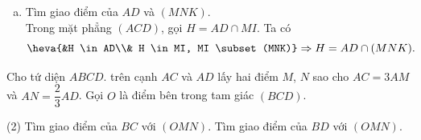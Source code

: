 \begin{vd}
{\begin{enumerate}[a)]
{}
			\item Tìm giao điểm của $AD$ và $(MNK)$.\\
			Trong mặt phẳng $(ACD)$, gọi $H=AD \cap MI$. Ta có
			$$\heva{&H \in AD\\& H \in MI, MI \subset (MNK)}\Rightarrow H=AD \cap (MNK).$$		
	\end{enumerate}}
\end{vd}

\begin{vd}
	Cho tứ diện $ABCD$. trên cạnh $AC$ và $AD$ lấy hai điểm $M$, $N$ sao cho $AC=3AM$ và $AN=\dfrac{2}{3}AD$. Gọi $O$ là điểm bên trong tam giác $(BCD)$.
	\begin{tasks}(2)
		\task Tìm giao điểm của $BC$ với $(OMN)$.
		\task Tìm giao điểm của $BD$ với $(OMN)$.
	\end{tasks}
	\loigiai{
		
}
\end{vd}
